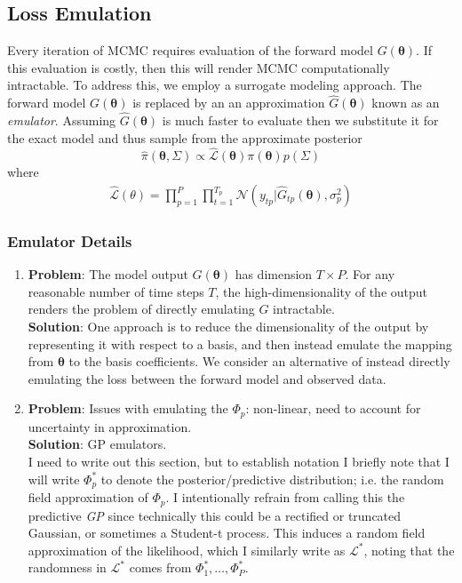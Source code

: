 \documentclass[12pt]{article}
\newcommand{\btheta}{\boldsymbol{\theta}}
\begin{document}
\subsection{Loss Emulation}
Every iteration of MCMC requires evaluation of the forward model $G(\btheta)$. If this evaluation is costly, then this will render MCMC computationally intractable. To address this, we employ a surrogate modeling approach. 
The forward model $G(\btheta)$ is replaced by an an approximation $\hat{G}(\btheta)$ known as an \textit{emulator}. Assuming $\hat{G}(\btheta)$ is much faster to evaluate then we substitute it for the exact model and thus 
sample from the approximate posterior
 \[\hat{\pi}(\btheta, \Sigma) \propto \hat{\mathcal{L}}(\btheta)\pi(\btheta)p(\Sigma)\]
 where 
 \begin{align*}
\hat{\mathcal{L}}(\theta) = \prod_{p = 1}^{P} \prod_{t = 1}^{T_p} \mathcal{N}\left(y_{tp}| \hat{G}_{tp}(\btheta), \sigma_p^2 \right)
\end{align*}
 
\subsubsection{Emulator Details}
\begin{enumerate}
\item \textbf{Problem}: The model output $G(\btheta)$ has dimension $T \times P$. For any reasonable number of time steps $T$, the high-dimensionality of the output renders the problem of directly emulating $G$ intractable.  \\
	\textbf{Solution}: One approach is to reduce the dimensionality of the output by representing it with respect to a basis, and then instead emulate the mapping from $\btheta$ to the basis coefficients. We consider an alternative 
	of instead directly emulating the loss between the forward model and observed data. 
	
\item \textbf{Problem}: Issues with emulating the $\Phi_p$: non-linear, need to account for uncertainty in approximation. \\
\textbf{Solution}: GP emulators. \\
I need to write out this section, but to establish notation I briefly note that I will write $\Phi_p^*$ to denote the posterior/predictive distribution; i.e. the random field approximation of $\Phi_p$. I intentionally refrain from calling 
this the predictive \textit{GP} since technically this could be a rectified or truncated Gaussian, or sometimes a Student-t process. This induces a random field approximation of the likelihood, which I similarly write as 
$\mathcal{L}^*$, noting that the randomness in $\mathcal{L}^*$ comes from $\Phi^*_1, \dots, \Phi^*_P$. 
	
\end{enumerate}
\end{document}
